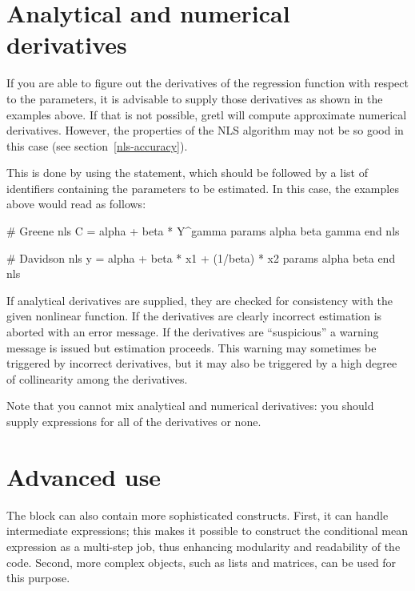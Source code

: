 \section{Analytical and numerical derivatives}
\label{nls-deriv}

If you are able to figure out the derivatives of the regression
function with respect to the parameters, it is advisable to supply
those derivatives as shown in the examples above.  If that is not
possible, gretl will compute approximate numerical derivatives.
However, the properties of the NLS algorithm may not be so good in
this case (see section~\ref{nls-accuracy}).

This is done by using the  statement, which should be
followed by a list of identifiers containing the parameters to be
estimated. In this case, the examples above would read as follows:

\begin{code}
# Greene
nls C = alpha + beta * Y^gamma
    params alpha beta gamma
end nls
\end{code}

\begin{code}
# Davidson
nls y = alpha + beta * x1 + (1/beta) * x2
    params alpha beta
end nls
\end{code}

If analytical derivatives are supplied, they are checked for
consistency with the given nonlinear function.  If the derivatives are
clearly incorrect estimation is aborted with an error message.  If the
derivatives are ``suspicious'' a warning message is issued but
estimation proceeds.  This warning may sometimes be triggered by
incorrect derivatives, but it may also be triggered by a high degree
of collinearity among the derivatives.

Note that you cannot mix analytical and numerical derivatives: you
should supply expressions for all of the derivatives or none.

\section{Advanced use}
\label{sec:nls-generalize}

The  block can also contain more sophisticated constructs.
First, it can handle intermediate expressions; this makes it possible
to construct the conditional mean expression as a multi-step job, thus
enhancing modularity and readability of the code. Second, more complex
objects, such as lists and matrices, can be used for this purpose.

